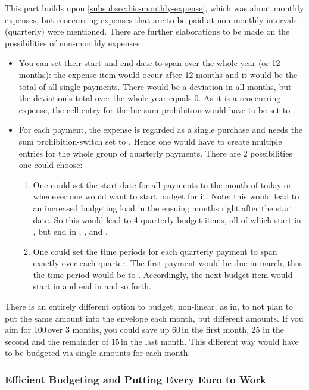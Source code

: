 This part builds upon \autoref{subsubsec:bic-monthly-expense}, which was about monthly expenses, but reoccurring expenses that are to be paid at non-monthly intervals (\eg quarterly) were mentioned.
There are further elaborations to be made on the possibilities of non-monthly expenses.
\begin{itemize}
	\item You can set their start and end date to span over the whole year (or 12 months): the expense item would occur after 12 months and it would be the total of all single payments.
	There would be a deviation in all months, but the deviation's total over the whole year equals 0.
	As it is a reoccurring expense, the cell entry for the \ac{bic} sum prohibition would have to be set to .
	\item For each payment, \ie the expense is regarded as a single purchase and needs the sum prohibition-switch set to .
	Hence one would have to create multiple entries for the whole group of quarterly payments.
	There are 2 possibilities one could choose:
	\begin{enumerate}
		\item One could set the start date for all payments to the month of today or whenever one would want to start budget for it.
		Note: this would lead to an increased budgeting load in the ensuing months right after the start date.
		So this would lead to 4 quarterly budget items, all of which start in , but end in , ,  and .
		\item One could set the time periods for each quarterly payment to span exactly over each quarter.
		The first payment would be due in march, thus the time period would be  to .
		Accordingly, the next budget item would start in  and end in  and so forth.
	\end{enumerate}
\end{itemize}

There is an entirely different option to budget: non-linear, as in, to not plan to put the same amount into the envelope each month, but different amounts.
If you aim for 100\,\texteuro over 3 months, you could save up 60\,\texteuro in the first month, 25 in the second and the remainder of 15\,\texteuro in the last month.
This different way would have to be budgeted via single amounts for each month.

\subsubsection{Efficient Budgeting and Putting Every Euro to Work}
\label{subsubsec:efficient-budgeting}

